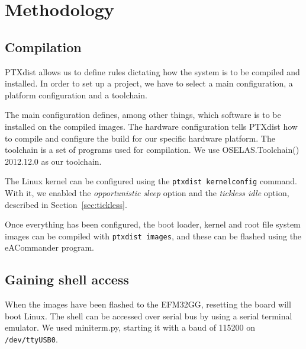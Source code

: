 \chapter{Methodology}



\section{Compilation}\label{sec:compilation}
PTXdist allows us to define rules dictating how the system is to be compiled and installed. In order to set up a project, we have to select a main configuration, a platform configuration and a toolchain.

The main configuration defines, among other things, which software is to be installed on the compiled images. The hardware configuration tells PTXdist how to compile and configure the build for our specific hardware platform. The toolchain is a set of programs used for compilation. We use OSELAS.Toolchain() 2012.12.0 as our toolchain.

The Linux kernel can be configured using the \texttt{ptxdist kernelconfig} command. With it, we enabled the \textit{opportunistic sleep} option and the \textit{tickless idle} option, described in Section~\ref{sec:tickless}.

Once everything has been configured, the boot loader, kernel and root file system images can be compiled with \texttt{ptxdist images}, and these can be flashed using the eACommander program.

\section{Gaining shell access}
When the images have been flashed to the EFM32GG, resetting the board will boot Linux. The shell can be accessed over serial bus by using a serial terminal emulator. We used miniterm.py, starting it with a baud of 115200 on \texttt{/dev/ttyUSB0}.

